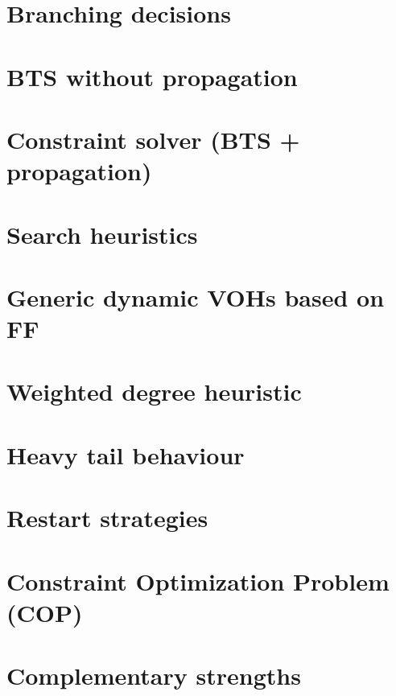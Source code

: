 \documentclass[12pt,a4paper,twoside]{book}
\begin{document}
\section{Branching decisions}

\label{s_4_2}

\section{BTS without propagation}

\label{s_4_3}

\section{Constraint solver (BTS + propagation)}

\label{s_4_4}

\section{Search heuristics}

\label{s_4_5}

\section{Generic dynamic VOHs based on FF}

\label{s_4_6}

\section{Weighted degree heuristic}

\label{s_4_7}

\section{Heavy tail behaviour}

\label{s_4_8}

\section{Restart strategies}

\label{s_4_9}

\section{Constraint Optimization Problem (COP)}

\label{s_4_10}

\section{Complementary strengths}

\label{s_4_11}
\end{document}
